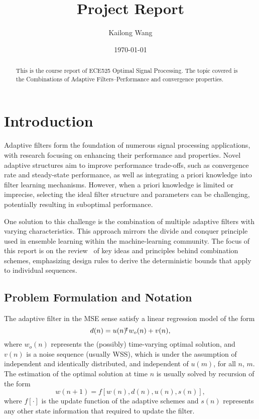 \documentclass{article}
\title{Project Report}
\author{Kailong Wang}
\date{\today}
\begin{document}
\maketitle

\begin{abstract}
This is the course report of ECE525 Optimal Signal Processing. The topic covered is the Combinations of Adaptive Filters--Performance and convergence properties.
\end{abstract}

\section{Introduction}
Adaptive filters form the foundation of numerous signal processing applications, with research focusing on enhancing their performance and properties.
Novel adaptive structures aim to improve performance trade-offs, such as convergence rate and steady-state performance, as well as integrating a priori knowledge into filter learning mechanisms.
However, when a priori knowledge is limited or imprecise, selecting the ideal filter structure and parameters can be challenging, potentially resulting in suboptimal performance.

One solution to this challenge is the combination of multiple adaptive filters with varying characteristics.
This approach mirrors the divide and conquer principle used in ensemble learning within the machine-learning community.
The focus of this report is on the review~\cite{Arenas_Garcia_2016} of key ideas and principles behind combination schemes, emphasizing design rules to derive the deterministic bounds that apply to individual sequences.

\subsection{Problem Formulation and Notation}
The adaptive filter in the MSE sense satisfy a linear regression model of the form
\begin{equation}
    d(n) = u(n){}^{\mkern-4mu\intercal} w_o(n)+v(n),
\end{equation}
where $w_o(n)$ represents the (possibly) time-varying optimal solution, and $v(n)$ is a noise sequence (usually WSS), which is under the assumption of independent and identically distributed, and independent of $u(m)$, for all $n$, $m$.
The estimation of the optimal solution at time $n$ is usually solved by recursion of the form\begin{equation}
    w(n+1)=f[w(n), d(n), u(n), s(n)],
\end{equation}
where $f[\cdot]$ is the update function of the adaptive schemes and $s(n)$ represents any other state information that required to update the filter.
\end{document}
